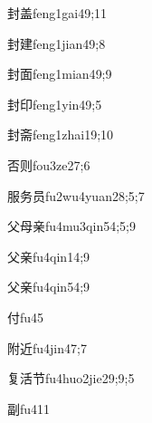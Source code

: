 \begin{verbete}{封盖}{feng1gai4}{9;11}
\end{verbete}

\begin{verbete}{封建}{feng1jian4}{9;8}
\end{verbete}

\begin{verbete}{封面}{feng1mian4}{9;9}
\end{verbete}

\begin{verbete}{封印}{feng1yin4}{9;5}
\end{verbete}

\begin{verbete}{封斋}{feng1zhai1}{9;10}
\end{verbete}

\begin{verbete}{否则}{fou3ze2}{7;6}
\end{verbete}

\begin{verbete}{服务员}{fu2wu4yuan2}{8;5;7}
\end{verbete}

\begin{verbete}{父母亲}{fu4mu3qin5}{4;5;9}
\end{verbete}

\begin{verbete}{父亲}{fu4qin1}{4;9}
\end{verbete}

\begin{verbete}{父亲}{fu4qin5}{4;9}
\end{verbete}

\begin{verbete}{付}{fu4}{5}
\end{verbete}

\begin{verbete}{附近}{fu4jin4}{7;7}
\end{verbete}

\begin{verbete}{复活节}{fu4huo2jie2}{9;9;5}
\end{verbete}

\begin{verbete}{副}{fu4}{11}
\end{verbete}

